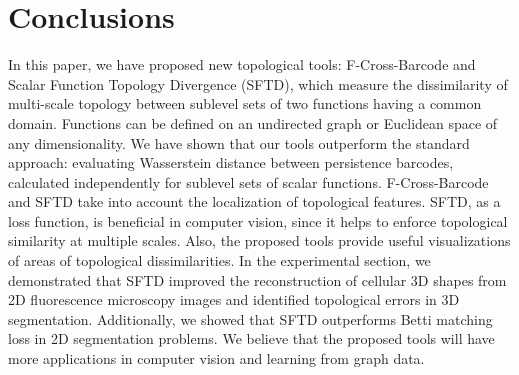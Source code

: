 \documentclass[runningheads]{llncs}
\begin{document}
\section{Conclusions}

In this paper, we have proposed new topological tools: F-Cross-Barcode and Scalar Function Topology Divergence (SFTD), which measure the dissimilarity of multi-scale topology between sublevel sets of two functions having a common domain. Functions can be defined on an undirected graph or Euclidean space of any dimensionality.
We have shown that our tools outperform the standard approach: evaluating Wasserstein distance between persistence barcodes, calculated independently for sublevel sets of scalar functions. 
F-Cross-Barcode and SFTD take into account the localization of topological features.
SFTD, as a loss function, is beneficial in computer vision, since it helps to enforce topological similarity at multiple scales. Also, the proposed tools provide useful visualizations of areas of topological dissimilarities.
In the experimental section, we demonstrated that SFTD improved the reconstruction of cellular 3D shapes from 2D fluorescence microscopy images and identified topological errors in 3D segmentation.
Additionally, we showed that SFTD outperforms Betti matching loss in 2D segmentation problems.
We believe that the proposed tools will have more applications in computer vision and learning from graph data.


\par\vfill\par
\end{document}
